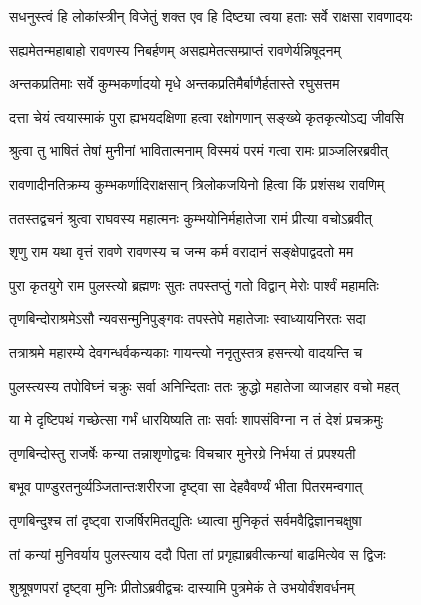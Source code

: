 \twolineshloka
{सधनुस्त्वं हि लोकांस्त्रीन् विजेतुं शक्त एव हि}
{दिष्ट्या त्वया हताः सर्वे राक्षसा रावणादयः} %

\twolineshloka
{सह्यमेतन्महाबाहो रावणस्य निबर्हणम्}
{असह्यमेतत्सम्प्राप्तं रावणेर्यन्निषूदनम्} %

\twolineshloka
{अन्तकप्रतिमाः सर्वे कुम्भकर्णादयो मृधे}
{अन्तकप्रतिमैर्बाणैर्हतास्ते रघुसत्तम} %

\twolineshloka
{दत्ता चेयं त्वयास्माकं पुरा ह्यभयदक्षिणा}
{हत्वा रक्षोगणान् सङ्ख्ये कृतकृत्योऽद्य जीवसि} %

\twolineshloka
{श्रुत्वा तु भाषितं तेषां मुनीनां भावितात्मनाम्}
{विस्मयं परमं गत्वा रामः प्राञ्जलिरब्रवीत्} %

\twolineshloka
{रावणादीनतिक्रम्य कुम्भकर्णादिराक्षसान्}
{त्रिलोकजयिनो हित्वा किं प्रशंसथ रावणिम्} %

\twolineshloka
{ततस्तद्वचनं श्रुत्वा राघवस्य महात्मनः}
{कुम्भयोनिर्महातेजा रामं प्रीत्या वचोऽब्रवीत्} %

\twolineshloka
{शृणु राम यथा वृत्तं रावणे रावणस्य च}
{जन्म कर्म वरादानं सङ्क्षेपाद्वदतो मम} %

\twolineshloka
{पुरा कृतयुगे राम पुलस्त्यो ब्रह्मणः सुतः}
{तपस्तप्तुं गतो विद्वान् मेरोः पार्श्वं महामतिः} %

\twolineshloka
{तृणबिन्दोराश्रमेऽसौ न्यवसन्मुनिपुङ्गवः}
{तपस्तेपे महातेजाः स्वाध्यायनिरतः सदा} %

\twolineshloka
{तत्राश्रमे महारम्ये देवगन्धर्वकन्यकाः}
{गायन्त्यो ननृतुस्तत्र हसन्त्यो वादयन्ति च} %

\twolineshloka
{पुलस्त्यस्य तपोविघ्नं चक्रुः सर्वा अनिन्दिताः}
{ततः क्रुद्धो महातेजा व्याजहार वचो महत्} %

\twolineshloka
{या मे दृष्टिपथं गच्छेत्सा गर्भं धारयिष्यति}
{ताः सर्वाः शापसंविग्ना न तं देशं प्रचक्रमुः} %

\twolineshloka
{तृणबिन्दोस्तु राजर्षेः कन्या तन्नाशृणोद्वचः}
{विचचार मुनेरग्रे निर्भया तं प्रपश्यती} %

\twolineshloka
{बभूव पाण्डुरतनुर्व्यञ्जितान्तःशरीरजा}
{दृष्ट्वा सा देहवैवर्ण्यं भीता पितरमन्वगात्} %

\twolineshloka
{तृणबिन्दुश्च तां दृष्ट्वा राजर्षिरमितद्युतिः}
{ध्यात्वा मुनिकृतं सर्वमवैद्विज्ञानचक्षुषा} %

\twolineshloka
{तां कन्यां मुनिवर्याय पुलस्त्याय ददौ पिता}
{तां प्रगृह्याब्रवीत्कन्यां बाढमित्येव स द्विजः} %

\twolineshloka
{शुश्रूषणपरां दृष्ट्वा मुनिः प्रीतोऽब्रवीद्वचः}
{दास्यामि पुत्रमेकं ते उभयोर्वंशवर्धनम्} %

